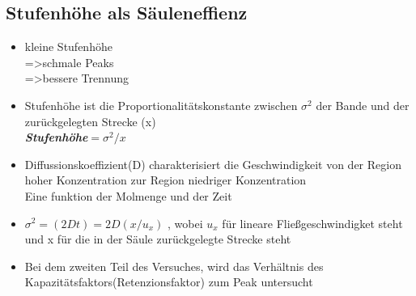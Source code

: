 \documentclass[a4paper]{article}
\begin{document}
\newpage


\subsection*{\small Stufenhöhe als Säuleneffienz}
\begin{itemize}
\item kleine Stufenhöhe \\
  =>schmale Peaks\\
  =>bessere Trennung
\item Stufenhöhe ist die Proportionalitätskonstante zwischen $\sigma^2$ der
      Bande und der zurückgelegten Strecke (x) \\
      \textbf{\textit{Stufenhöhe}$=\sigma^2/x$}
\item Diffussionskoeffizient(D) charakterisiert die Geschwindigkeit von der
Region hoher Konzentration zur Region niedriger Konzentration\\
       Eine funktion der Molmenge und der Zeit
\item $\sigma^2=(2Dt)=2D(x/u_x)$ , wobei $u_x$ für lineare Fließgeschwindigket
  steht und x für die in der Säule zurückgelegte Strecke steht  
\item Bei dem zweiten Teil des Versuches, wird das Verhältnis des\\
  Kapazitätsfaktors(Retenzionsfaktor) zum Peak untersucht  

\end{itemize}
\end{document}
